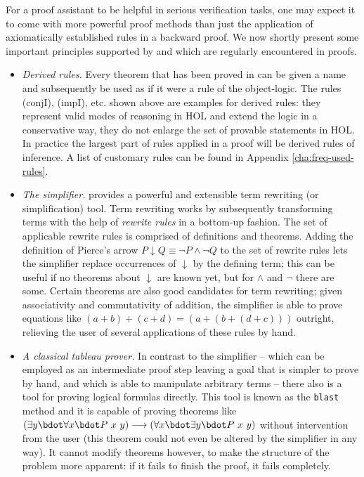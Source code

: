 For a proof assistant to be helpful in serious verification tasks, one may
expect it to come with more powerful proof methods than just the application of
axiomatically established rules in a backward proof. We now shortly present some
important principles supported by \Isabelle and which are regularly encountered
in proofs.

\begin{itemize}
\item \emph{Derived rules.} Every theorem that has been proved in \Isabelle can
  be given a name and subsequently be used as if it were a rule of the
  object-logic. The rules (conjI), (impI), etc. shown above are examples for
  derived rules: they represent valid modes of reasoning in HOL and
  extend the logic in a conservative way, \IE they do not enlarge the set of
  provable statements in HOL. In practice the largest part of rules applied in a
  proof will be derived rules of inference. A list of customary rules can be
  found in Appendix \ref{cha:freq-used-rules}.

\item \emph{The simplifier.} \Isabelle provides a powerful and extensible term
  rewriting (or simplification) tool. Term rewriting works by subsequently
  transforming terms with the help of \emph{rewrite rules} in a bottom-up
  fashion. The set of applicable rewrite rules is comprised of definitions and
  theorems. Adding the definition of Pierce's arrow $P\downarrow Q \equiv \lnot P \land \lnot Q$ to the set
  of rewrite rules lets the simplifier replace  occurrences of $\downarrow$ by the defining
  term; this can be useful if no theorems about $\downarrow$ are known yet, but for $\land$
  and $\lnot$ there are some. Certain theorems are also good candidates for term
  rewriting; given associativity and commutativity of
  addition, the simplifier is able to prove equations like $(a + b) + (c + d) =
  (a + (b + (d + c)))$ outright, relieving the user of several applications of
  these rules by hand.

\item \emph{A classical tableau prover.} In contrast to the simplifier -- which
  can be employed as an intermediate proof step leaving a goal that is simpler
  to prove by hand, and which is able to manipulate arbitrary terms -- there
  also is a tool for proving logical formulas directly. This tool is known as
  the \texttt{blast} method and it is capable of proving theorems like $(\exists y\bdot
  \forall x\bdot P\ x\ y) \longrightarrow (\forall x\bdot \exists y\bdot P\ x\ y)$ without intervention from the
  user (this theorem could not even be altered by the simplifier in any way). It
  cannot modify theorems however, \EG to make the structure of the problem more
  apparent: if it fails to finish the proof, it fails completely.
\end{itemize}

